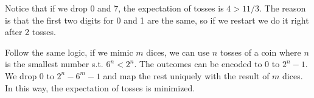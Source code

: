 \documentclass[10pt, onecolumn, draftcls]{IEEEtran}
\begin{document}
\begin{enumerate}
Notice that if we drop 0 and 7, the expectation of tosses is $4>11/3$. The reason is that the first two digits for 0 and 1 are the same, so if we restart we do it right after 2 tosses.

Follow the same logic, if we mimic $m$ dices, we can use $n$ tosses of a coin where $n$ is the smallest number s.t. $6^n<2^n$. The outcomes can be encoded to 0 to $2^n-1$. We drop $0$ to $2^n-6^m-1$ and map the rest uniquely with the result of $m$ dices. In this way, the expectation of tosses is minimized.
\end{enumerate}
\end{document}
